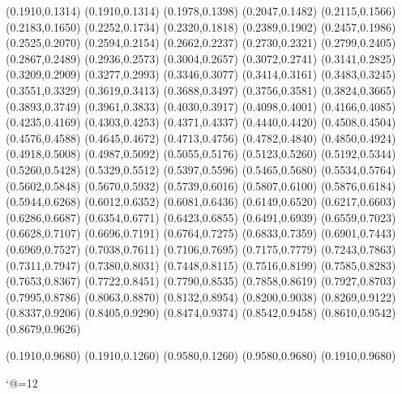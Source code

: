 \PST@Dotted(0.1910,0.1314)
(0.1910,0.1314)
(0.1978,0.1398)
(0.2047,0.1482)
(0.2115,0.1566)
(0.2183,0.1650)
(0.2252,0.1734)
(0.2320,0.1818)
(0.2389,0.1902)
(0.2457,0.1986)
(0.2525,0.2070)
(0.2594,0.2154)
(0.2662,0.2237)
(0.2730,0.2321)
(0.2799,0.2405)
(0.2867,0.2489)
(0.2936,0.2573)
(0.3004,0.2657)
(0.3072,0.2741)
(0.3141,0.2825)
(0.3209,0.2909)
(0.3277,0.2993)
(0.3346,0.3077)
(0.3414,0.3161)
(0.3483,0.3245)
(0.3551,0.3329)
(0.3619,0.3413)
(0.3688,0.3497)
(0.3756,0.3581)
(0.3824,0.3665)
(0.3893,0.3749)
(0.3961,0.3833)
(0.4030,0.3917)
(0.4098,0.4001)
(0.4166,0.4085)
(0.4235,0.4169)
(0.4303,0.4253)
(0.4371,0.4337)
(0.4440,0.4420)
(0.4508,0.4504)
(0.4576,0.4588)
(0.4645,0.4672)
(0.4713,0.4756)
(0.4782,0.4840)
(0.4850,0.4924)
(0.4918,0.5008)
(0.4987,0.5092)
(0.5055,0.5176)
(0.5123,0.5260)
(0.5192,0.5344)
(0.5260,0.5428)
(0.5329,0.5512)
(0.5397,0.5596)
(0.5465,0.5680)
(0.5534,0.5764)
(0.5602,0.5848)
(0.5670,0.5932)
(0.5739,0.6016)
(0.5807,0.6100)
(0.5876,0.6184)
(0.5944,0.6268)
(0.6012,0.6352)
(0.6081,0.6436)
(0.6149,0.6520)
(0.6217,0.6603)
(0.6286,0.6687)
(0.6354,0.6771)
(0.6423,0.6855)
(0.6491,0.6939)
(0.6559,0.7023)
(0.6628,0.7107)
(0.6696,0.7191)
(0.6764,0.7275)
(0.6833,0.7359)
(0.6901,0.7443)
(0.6969,0.7527)
(0.7038,0.7611)
(0.7106,0.7695)
(0.7175,0.7779)
(0.7243,0.7863)
(0.7311,0.7947)
(0.7380,0.8031)
(0.7448,0.8115)
(0.7516,0.8199)
(0.7585,0.8283)
(0.7653,0.8367)
(0.7722,0.8451)
(0.7790,0.8535)
(0.7858,0.8619)
(0.7927,0.8703)
(0.7995,0.8786)
(0.8063,0.8870)
(0.8132,0.8954)
(0.8200,0.9038)
(0.8269,0.9122)
(0.8337,0.9206)
(0.8405,0.9290)
(0.8474,0.9374)
(0.8542,0.9458)
(0.8610,0.9542)
(0.8679,0.9626)

\PST@Border(0.1910,0.9680)
(0.1910,0.1260)
(0.9580,0.1260)
(0.9580,0.9680)
(0.1910,0.9680)

\catcode`@=12
\fi
\endpspicture
